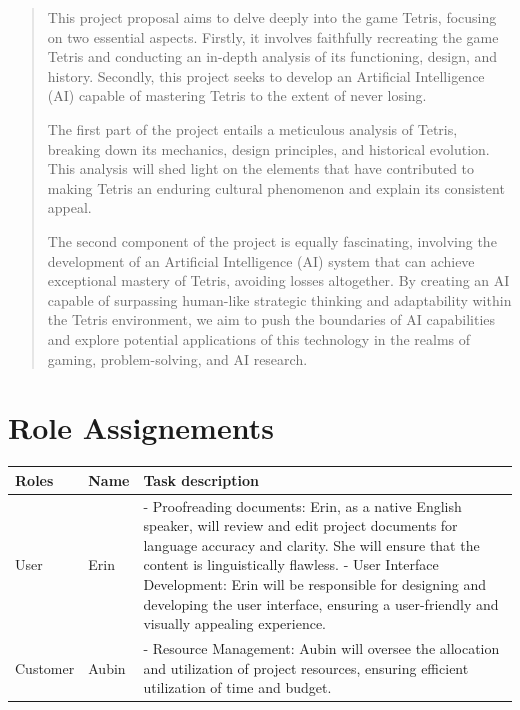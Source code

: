 \documentclass[conference]{IEEEtran}
\begin{document}
\maketitle
\begin{abstract}
This project proposal aims to delve deeply into the game Tetris, focusing on two essential aspects. Firstly, it involves faithfully recreating the game Tetris and conducting an in-depth analysis of its functioning, design, and history. Secondly, this project seeks to develop an Artificial Intelligence (AI) capable of mastering Tetris to the extent of never losing.

The first part of the project entails a meticulous analysis of Tetris, breaking down its mechanics, design principles, and historical evolution. This analysis will shed light on the elements that have contributed to making Tetris an enduring cultural phenomenon and explain its consistent appeal.

The second component of the project is equally fascinating, involving the development of an Artificial Intelligence (AI) system that can achieve exceptional mastery of Tetris, avoiding losses altogether. By creating an AI capable of surpassing human-like strategic thinking and adaptability within the Tetris environment, we aim to push the boundaries of AI capabilities and explore potential applications of this technology in the realms of gaming, problem-solving, and AI research.
\end{abstract}

\section*{Role Assignements}

\begin{center}
\begin{tabular}{ | m{1.5cm} | m{1.2cm}| m{5cm} | } 
    \hline
    Roles & Name & Task description \\
    \hline
    User & 
    Erin & 
    - Proofreading documents: Erin, as a native English speaker, will review and edit project documents for language accuracy and clarity. She will ensure that the content is linguistically flawless.
    \newline- User Interface Development: Erin will be responsible for designing and developing the user interface, ensuring a user-friendly and visually appealing experience.\\
    \hline
    Customer & 
    Aubin & 
    - Resource Management: Aubin will oversee the allocation and utilization of project resources, ensuring efficient utilization of time and budget.\\
    
\end{tabular}
\end{center}
\end{document}
